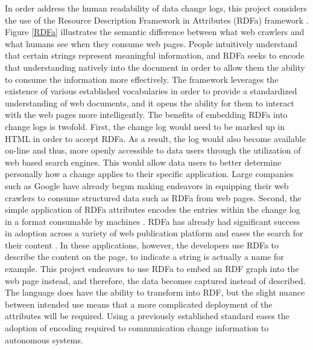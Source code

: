 In order address the human readability of data change logs, this project considers the use of the Resource Description Framework in Attributes (RDFa) framework \cite{Adida2015}.
Figure \ref{RDFa} illustrates the semantic difference between what web crawlers and what humans see when they consume web pages.
People intuitively understand that certain strings represent meaningful information, and RDFa seeks to encode that understanding natively into the document in order to allow them the ability to consume the information more effectively.
The framework leverages the existence of various established vocabularies in order to provide a standardized understanding of web documents, and it opens the ability for them to interact with the web pages more intelligently.
The benefits of embedding RDFa into change logs is twofold.
First, the change log would need to be marked up in HTML in order to accept RDFa.
As a result, the log would also become available on-line and thus, more openly accessible to data users through the utilization of web based search engines.
This would allow data users to better determine personally how a change applies to their specific application.
Large companies such as Google have already begun making endeavors in equipping their web crawlers to consume structured data such as RDFa from web pages.
Second, the simple application of RDFa attributes encodes the entries within the change log in a format consumable by machines \cite{Herman2015}.
RDFa has already had significant success in adoption across a variety of web publication platform and eases the search for their content \cite{Bizer2013}.
In these applications, however, the developers use RDFa to describe the content on the page, to indicate a string is actually a name for example.
This project endeavors to use RDFa to embed an RDF graph into the web page instead, and therefore, the data becomes captured instead of described.
The language does have the ability to transform into RDF, but the slight nuance between intended use means that a more complicated deployment of the attributes will be required.
Using a previously established standard eases the adoption of encoding required to communication change information to autonomous systems.

